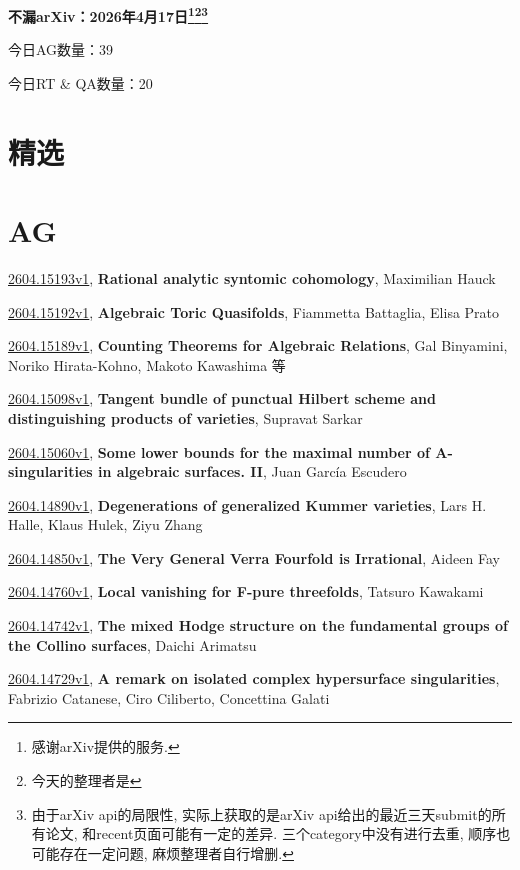 \documentclass[9pt, a4paper]{article}
\theoremstyle{plain}
\theoremstyle{definition}
\theoremstyle{remark}
\newcommand{\arxiv}[3]{\href{https://arxiv.org/abs/#1}{#1}, \textbf{\textcolor{arxivblue}{#2}}, #3}
\newcommand{\AGnumber}{39}
\newcommand{\RTQAnumber}{20}
\newcommand{\NewestDate}{2026年4月17日}
\newcommand{\todayarXiver}{} %
\begin{document}
\begin{center}
    \Huge\textbf{不漏arXiv：\NewestDate\footnote{感谢arXiv提供的服务.}\footnote{今天的整理者是\todayarXiver}\footnote{由于arXiv api的局限性, 实际上获取的是arXiv api给出的最近三天submit的所有论文, 和recent页面可能有一定的差异. 三个category中没有进行去重, 顺序也可能存在一定问题, 麻烦整理者自行增删.}} \\
\end{center}

\setcounter{section}{-1}

\begin{center}
    今日AG数量：\AGnumber
    
    今日RT \& QA数量：\RTQAnumber
    
\end{center}


\section{精选}


\section{AG}
\arxiv{2604.15193v1}{Rational analytic syntomic cohomology}{Maximilian Hauck}

\arxiv{2604.15192v1}{Algebraic Toric Quasifolds}{Fiammetta Battaglia, Elisa Prato}

\arxiv{2604.15189v1}{Counting Theorems for Algebraic Relations}{Gal Binyamini, Noriko Hirata-Kohno, Makoto Kawashima 等}

\arxiv{2604.15098v1}{Tangent bundle of punctual Hilbert scheme and distinguishing products of varieties}{Supravat Sarkar}

\arxiv{2604.15060v1}{Some lower bounds for the maximal number of A-singularities in algebraic surfaces. II}{Juan García Escudero}

\arxiv{2604.14890v1}{Degenerations of generalized Kummer varieties}{Lars H. Halle, Klaus Hulek, Ziyu Zhang}

\arxiv{2604.14850v1}{The Very General Verra Fourfold is Irrational}{Aideen Fay}

\arxiv{2604.14760v1}{Local vanishing for F-pure threefolds}{Tatsuro Kawakami}

\arxiv{2604.14742v1}{The mixed Hodge structure on the fundamental groups of the Collino surfaces}{Daichi Arimatsu}

\arxiv{2604.14729v1}{A remark on isolated complex hypersurface singularities}{Fabrizio Catanese, Ciro Ciliberto, Concettina Galati}
\end{document}
